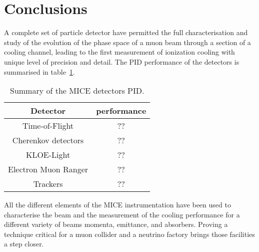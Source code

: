 \graphicspath{{80-Conclusions/Figures/}}

\section{Conclusions}
\label{Sect:Conclusions}

A complete set of particle detector have permitted the full characterisation and study of the evolution of the phase space of a muon beam through a section of a cooling channel, leading to the first measurement of ionization cooling with unique level of precision and detail.
The PID performance of the detectors is summarised in table~\ref{tab:pid}.


\begin{table}[htb!]
	\centering
	\begin{tabular}{c|c}
	  Detector              & performance \\
		\hline
    Time-of-Flight        & ?? \\
    Cherenkov detectors   & ?? \\
    KLOE-Light            & ?? \\
    Electron Muon Ranger  & ?? \\
    Trackers              & ?? \\
  \end{tabular}
	\caption{Summary of the MICE detectors PID.}
	\label{tab:pid}
\end{table}

All the different elements of the MICE instrumentation have been used to characterise the beam and the measurement of the cooling performance for a different variety of beams momenta, emittance, and absorbers.
Proving a technique critical for a muon collider and a neutrino factory brings those facilities a step closer.
